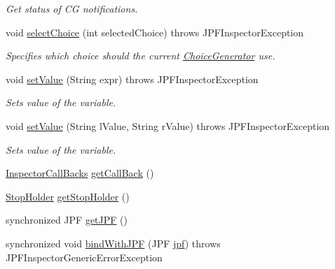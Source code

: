 \begin{DoxyCompactItemize}
\begin{DoxyCompactList}\small\item\em Get status of CG notifications. \end{DoxyCompactList}\item 
void \hyperlink{classgov_1_1nasa_1_1jpf_1_1inspector_1_1server_1_1jpf_1_1_j_p_f_inspector_parallel_a5898acc4397d757c67657541c29f8322}{select\+Choice} (int selected\+Choice)  throws J\+P\+F\+Inspector\+Exception 
\begin{DoxyCompactList}\small\item\em Specifies which choice should the current \hyperlink{}{Choice\+Generator} use. \end{DoxyCompactList}\item 
void \hyperlink{classgov_1_1nasa_1_1jpf_1_1inspector_1_1server_1_1jpf_1_1_j_p_f_inspector_parallel_a1c3264f06b28f41e6b0ded6c5f71863a}{set\+Value} (String expr)  throws J\+P\+F\+Inspector\+Exception 
\begin{DoxyCompactList}\small\item\em Sets value of the variable. \end{DoxyCompactList}\item 
void \hyperlink{classgov_1_1nasa_1_1jpf_1_1inspector_1_1server_1_1jpf_1_1_j_p_f_inspector_parallel_a35d1f2b50faf4f50aebb6722f43eb7da}{set\+Value} (String l\+Value, String r\+Value)  throws J\+P\+F\+Inspector\+Exception 
\begin{DoxyCompactList}\small\item\em Sets value of the variable. \end{DoxyCompactList}\item 
\hyperlink{interfacegov_1_1nasa_1_1jpf_1_1inspector_1_1interfaces_1_1_inspector_call_backs}{Inspector\+Call\+Backs} \hyperlink{classgov_1_1nasa_1_1jpf_1_1inspector_1_1server_1_1jpf_1_1_j_p_f_inspector_aa162cc3bac2d88c62d170d036c5e1ccc}{get\+Call\+Back} ()
\item 
\hyperlink{classgov_1_1nasa_1_1jpf_1_1inspector_1_1server_1_1jpf_1_1_stop_holder}{Stop\+Holder} \hyperlink{classgov_1_1nasa_1_1jpf_1_1inspector_1_1server_1_1jpf_1_1_j_p_f_inspector_ae952010e74e90389ddb3cef055a0d592}{get\+Stop\+Holder} ()
\item 
synchronized J\+PF \hyperlink{classgov_1_1nasa_1_1jpf_1_1inspector_1_1server_1_1jpf_1_1_j_p_f_inspector_a477c3ffc6d31e17de09b335f801ad902}{get\+J\+PF} ()
\item 
synchronized void \hyperlink{classgov_1_1nasa_1_1jpf_1_1inspector_1_1server_1_1jpf_1_1_j_p_f_inspector_a7bdbd7beca9adc2c57e0f01b295655bb}{bind\+With\+J\+PF} (J\+PF \hyperlink{classgov_1_1nasa_1_1jpf_1_1inspector_1_1server_1_1jpf_1_1_j_p_f_inspector_a04fbb7b09b55ee2c777428d3833fc353}{jpf})  throws J\+P\+F\+Inspector\+Generic\+Error\+Exception 

\end{DoxyCompactItemize}

